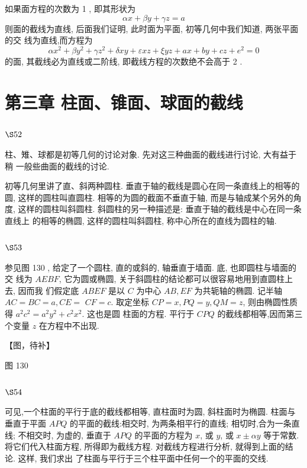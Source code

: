 如果面方程的次数为 1 , 即其形状为
\[
\alpha x+\beta y+\gamma z=a
\]
则面的截线为直线, 后面我们证明, 此时面为平面, 初等几何中我们知道, 两张平面的交 线为直线,而方程为
\[
\alpha x^{2}+\beta y^{2}+\gamma z^{2}+\delta x y+\varepsilon x z+\xi y z+a x+b y+c z+e^{2}=0
\]
的面, 其截线必为直线或二阶线, 即截线方程的次数绝不会高于 2 .

\chapter{第三章 柱面、锥面、球面的截线}

\section{$\S 52$}

柱、雉、球都是初等几何的讨论对象. 先对这三种曲面的截线进行讨论, 大有益于稍 一般些曲面的截线的讨论.

初等几何里讲了直、斜两种圆柱. 垂直于轴的截线是圆心在同一条直线上的相等的 圆, 这样的圆柱叫直圆柱. 相等的为圆的截面不垂直于轴, 而是与轴成某个另外的角度, 这样的圆柱叫斜圆柱. 斜圆柱的另一种描述是: 垂直于轴的截线是中心在同一条直线上 的相等的椭圆, 这样的圆柱叫斜圆柱, 称中心所在的直线为圆柱的轴.

\section{$\S 53$}

参见图 130 , 给定了一个圆柱, 直的或斜的, 轴垂直于墙面. 底, 也即圆柱与墙面的交 线为 $A E B F$, 它为圆或椭圆, 关于斜圆柱的结论都可以很容易地用到直圆柱上去, 因而我 们假定底 $A B E F$ 是以 $C$ 为中心 $A B, E F$ 为共轭轴的椭圆. 记半轴 $A C=B C=a, C E=$ $C F=c$. 取定坐标 $C P=x, P Q=y, Q M=z$, 则由椭圆性质得 $a^{2} c^{2}=a^{2} y^{2}+c^{2} x^{2}$. 这也是圆 柱面的方程. 平行于 $C P Q$ 的截线都相等,因而第三个变量 $z$ 在方程中不出现.


【图，待补】

图 130

\section{$\S 54$}

可见,一个柱面的平行于底的截线都相等, 直柱面时为圆, 斜柱面时为椭圆. 柱面与 垂直于平面 $A P Q$ 的平面的截线:相交时, 为两条相平行的直线; 相切时,合为一条直线; 不相交时, 为虚的, 垂直于 $A P Q$ 的平面的方程为 $x$, 或 $y$, 或 $x \pm \alpha y$ 等于常数. 将它们代入柱面方程, 所得即为截线方程. 对截线方程进行分析, 就得到上面的结论. 这样, 我们求出 了柱面与平行于三个柱平面中任何一个的平面的交线.

